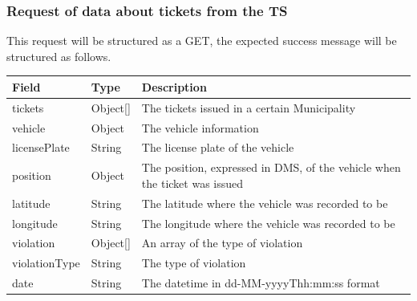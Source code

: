				\subsubsection{Request of data about tickets from the TS}
					This request will be structured as a GET, the expected success message will be structured as follows.
					\begin{table}[!h]
						\begin{tabular}{L{0.25\textwidth}L{0.1\textwidth}L{0.45\textwidth}}
							\toprule
							Field & Type & Description \\
							\midrule
							tickets & Object[] & The tickets issued in a certain Municipality \\
							\hspace{2.5mm}vehicle & Object & The vehicle information \\
							\hspace{5mm}licensePlate & String & The license plate of the vehicle \\
							\hspace{2.5mm}position & Object & The position, expressed in DMS, of the vehicle when the ticket was issued  \\
							\hspace{5mm}latitude & String & The latitude where the vehicle was recorded to be \\
							\hspace{5mm}longitude & String & The longitude where the vehicle was recorded to be \\
							\hspace{2.5mm}violation & Object[] & An array of the type of violation \\
							\hspace{5mm}violationType & String & The type of violation \\
							\hspace{2.5mm}date & String & The datetime in \newline dd-MM-yyyyThh:mm:ss format \\								 	\bottomrule
								\end{tabular}
							\end{table}

